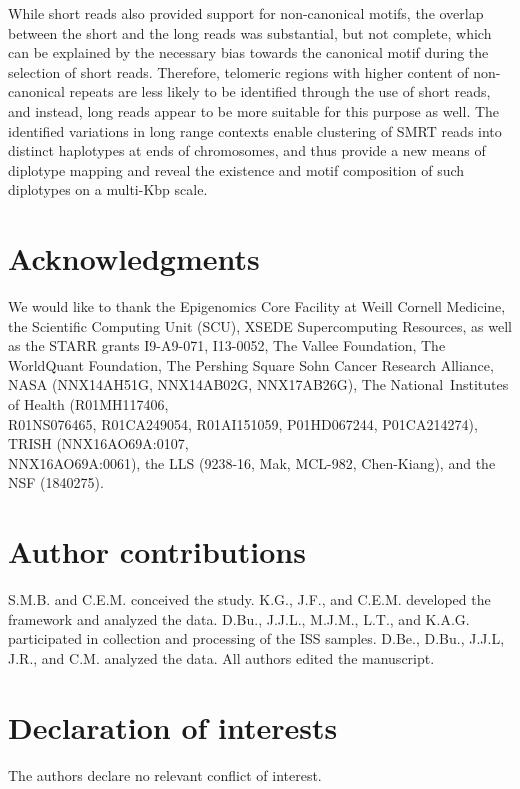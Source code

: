 \documentclass{article}
\begin{document}
While short reads also provided support for non-canonical motifs, the overlap between the short and the long reads was substantial, but not complete, which can be explained by the necessary bias towards the canonical motif during the selection of short reads.
Therefore, telomeric regions with higher content of non-canonical repeats are less likely to be identified through the use of short reads, and instead, long reads appear to be more suitable for this purpose as well.
The identified variations in long range contexts enable clustering of SMRT reads into distinct haplotypes at ends of chromosomes, and thus provide a new means of diplotype mapping and reveal the existence and motif composition of such diplotypes on a multi-Kbp scale.

\section*{Acknowledgments} 
We would like to thank
the Epigenomics Core Facility at Weill Cornell Medicine,
the Scientific Computing Unit (SCU),
XSEDE Supercomputing Resources,
as well as
the STARR grants I9-A9-071, I13-0052,
The Vallee Foundation,
The WorldQuant Foundation,
The Pershing Square Sohn Cancer Research Alliance,
NASA (NNX14AH51G, NNX14AB02G, NNX17AB26G),
The National Institutes of Health (R01MH117406, \\%
R01NS076465, R01CA249054, R01AI151059, P01HD067244, P01CA214274),
TRISH (NNX16AO69A:0107, \\%
NNX16AO69A:0061),
the LLS (9238-16, Mak, MCL-982, Chen-Kiang),
and
the NSF (1840275).

\section*{Author contributions} 
S.M.B. and C.E.M. conceived the study.
K.G., J.F., and C.E.M. developed the framework and analyzed the data.
D.Bu., J.J.L., M.J.M., L.T., and K.A.G. participated in collection and processing of the ISS samples.
D.Be., D.Bu., J.J.L, J.R., and C.M. analyzed the data.
All authors edited the manuscript.

\section*{Declaration of interests} 
The authors declare no relevant conflict of interest.
\end{document}
